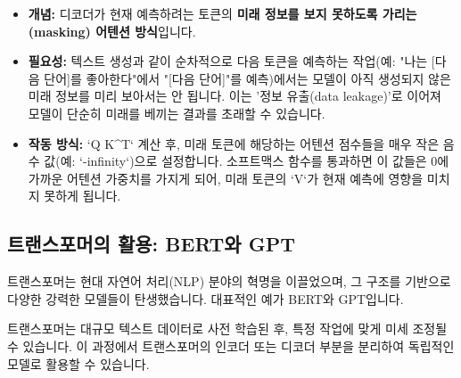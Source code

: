 \documentclass[11pt,a4paper]{article}
\begin{document}
\begin{conceptbox}[title={마스크드 멀티 헤드 어텐션의 목적}]
\begin{itemize}
    \item \textbf{개념:} 디코더가 현재 예측하려는 토큰의 \textbf{미래 정보를 보지 못하도록 가리는(masking) 어텐션 방식}입니다.
    \item \textbf{필요성:} 텍스트 생성과 같이 순차적으로 다음 토큰을 예측하는 작업(예: "나는 [다음 단어]를 좋아한다"에서 "[다음 단어]"를 예측)에서는 모델이 아직 생성되지 않은 미래 정보를 미리 보아서는 안 됩니다. 이는 '정보 유출(data leakage)'로 이어져 모델이 단순히 미래를 베끼는 결과를 초래할 수 있습니다.
    \item \textbf{작동 방식:} `Q K^T` 계산 후, 미래 토큰에 해당하는 어텐션 점수들을 매우 작은 음수 값(예: `-infinity`)으로 설정합니다. 소프트맥스 함수를 통과하면 이 값들은 0에 가까운 어텐션 가중치를 가지게 되어, 미래 토큰의 `V`가 현재 예측에 영향을 미치지 못하게 됩니다.
\end{itemize}
\end{conceptbox}

\subsection{트랜스포머의 활용: BERT와 GPT}
트랜스포머는 현대 자연어 처리(NLP) 분야의 혁명을 이끌었으며, 그 구조를 기반으로 다양한 강력한 모델들이 탄생했습니다. 대표적인 예가 BERT와 GPT입니다.

\begin{conceptbox}[title={트랜스포머를 찢어 활용하기}]
트랜스포머는 대규모 텍스트 데이터로 사전 학습된 후, 특정 작업에 맞게 미세 조정될 수 있습니다. 이 과정에서 트랜스포머의 인코더 또는 디코더 부분을 분리하여 독립적인 모델로 활용할 수 있습니다.
\end{conceptbox}
\end{document}

